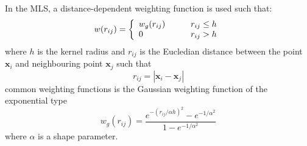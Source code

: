 \documentclass[12pt]{extarticle}
\begin{document}
In the MLS, a distance-dependent weighting function is used such that:
\[ w(r_{ij}) = \left\{
  \begin{array}{l l l l l l}
    w_{g}(r_{ij}) & \quad  & r_{ij} \leq h \\
    0 & \quad  & r_{ij} > h
  \end{array} \right.\]
\begin{equation}
  \label{eq044}
\end{equation}
where $h$ is the kernel radius and $r_{ij}$ is the Eucledian distance between the point $\textbf{x}_{i}$ and neighbouring point $\textbf{x}_{j}$ such that
\begin{equation}
r_{ij} = \left| \textbf{x}_{i}-\textbf{x}_{j} \right|
  \label{eq045}
\end{equation}
common weighting functions is the Gaussian weighting function of the exponential type
\begin{equation}
w_g(r_{ij}) = \frac{e^{-(r_{ij}/\alpha h)^{2}}-e^{-1/\alpha^{2}}}{1-e^{-1/\alpha^{2}}}
  \label{eq046}
\end{equation}
where $\alpha$ is a shape parameter.
\end{document}
